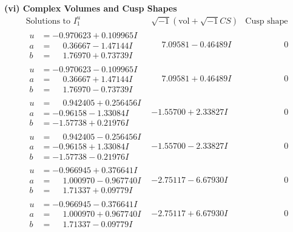 \documentclass[1p]{elsarticle_modified}
\theoremstyle{definition}
\newcommand{\I}{\sqrt{-1}}
\begin{document}
\newpage\flushleft \textbf{(vi) Complex Volumes and Cusp Shapes}
$$\begin{array}{c|c|c}  
\text{Solutions to }I^u_{1}& \I (\text{vol} + \sqrt{-1}CS) & \text{Cusp shape}\\
 \hline 
\begin{aligned}
u &= -0.970623 + 0.109965 I \\
a &= \phantom{-}0.36667 - 1.47144 I \\
b &= \phantom{-}1.76970 + 0.73739 I\end{aligned}
 & \phantom{-}7.09581 - 0.46489 I & \phantom{-0.000000 } 0 \\ \hline\begin{aligned}
u &= -0.970623 - 0.109965 I \\
a &= \phantom{-}0.36667 + 1.47144 I \\
b &= \phantom{-}1.76970 - 0.73739 I\end{aligned}
 & \phantom{-}7.09581 + 0.46489 I & \phantom{-0.000000 } 0 \\ \hline\begin{aligned}
u &= \phantom{-}0.942405 + 0.256456 I \\
a &= -0.96158 - 1.33084 I \\
b &= -1.57738 + 0.21976 I\end{aligned}
 & -1.55700 + 2.33827 I & \phantom{-0.000000 } 0 \\ \hline\begin{aligned}
u &= \phantom{-}0.942405 - 0.256456 I \\
a &= -0.96158 + 1.33084 I \\
b &= -1.57738 - 0.21976 I\end{aligned}
 & -1.55700 - 2.33827 I & \phantom{-0.000000 } 0 \\ \hline\begin{aligned}
u &= -0.966945 + 0.376641 I \\
a &= \phantom{-}1.000970 - 0.967740 I \\
b &= \phantom{-}1.71337 + 0.09779 I\end{aligned}
 & -2.75117 - 6.67930 I & \phantom{-0.000000 } 0 \\ \hline\begin{aligned}
u &= -0.966945 - 0.376641 I \\
a &= \phantom{-}1.000970 + 0.967740 I \\
b &= \phantom{-}1.71337 - 0.09779 I\end{aligned}
 & -2.75117 + 6.67930 I & \phantom{-0.000000 } 0 \\ \hline\begin{aligned}

\end{aligned}
\end{array}$$
\end{document}
